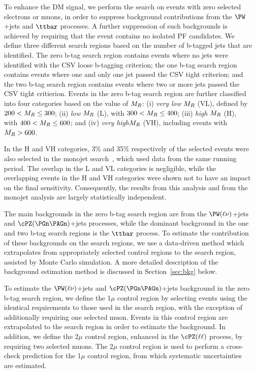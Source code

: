 To enhance the DM signal, we perform the search on events with zero selected electrons or muons,
in order to suppress background contributions from the $\PW$+jets and $\ttbar$ processes. 
A further suppression of such backgrounds is achieved by requiring that the event contains no isolated 
PF candidates. We define three different search regions based on the number of b-tagged jets that are
identified. The zero b-tag search region contains events where no jets were identified with the CSV loose 
b-tagging criterion; the one b-tag search region contains events where one and only one jet
passed the CSV tight criterion; and the two b-tag search region contains events where two or more
jets passed the CSV tight critierion. Events in the zero b-tag search region are further classified 
into four categories based on the value of $M_R$: 
(i) \textit{very low} $M_R$ (VL), defined by $200<M_R \leq 300$\GeV; 
(ii) \textit{low} $M_R$ (L), with $300 <M_R \leq 400$\GeV; 
(iii) \textit{high} $M_R$ (H), with $400 <M_R\leq 600$\GeV; 
and (iv) \textit{very high}$M_R$ (VH), including events with $M_R>600$\GeV. 

In the H and VH categories, 3\% and 35\% respectively of the selected
events were also selected in the monojet search~\cite{monojet8TeV}, which used data from the same running period.
The overlap
in the L and VL categories is negligible, while the overlapping events in the H and VH categories were shown not to have an impact on the final sensitivity. Consequently, the results
from this analysis and from the monojet analysis are largely statistically independent.

The main backgrounds in the zero b-tag search region are from the $\PW(\ell\nu)$+jets 
and $\cPZ(\PGn\PAGn)$+jets processes, while the dominant background in the one and two
b-tag search regions is the $\ttbar$ process. To estimate the contribution of these
backgrounds on the search regions, we use a data-driven method which extrapolates
from appropriately selected control regions to the search region, assisted by 
Monte Carlo simulation. A more detailed description of the background
estimation method is discussed in Section~\ref{sec:bkg} below. 

To estimate the $\PW(\ell\nu)$+jets and $\cPZ(\PGn\PAGn)$+jets background in the
zero b-tag search region, we define the 1$\mu$ control region by selecting events
using the identical requirements to those used in the search region, with the exception 
of additionally requiring one selected muon. Events in this control region are extrapolated
to the search region in order to estimate the background. In addition, we define 
the 2$\mu$ control region, enhanced in the $\cPZ(\ell \ell)$ process, by requiring two selected 
muons. The 2$\mu$ control region is used to perform a cross-check prediction for the
1$\mu$ control region, from which systematic uncertainties are estimated.


